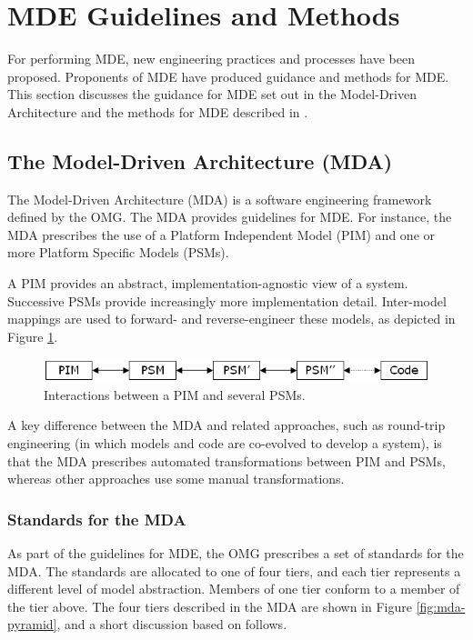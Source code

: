 
\section{MDE Guidelines and Methods}
\label{sec:mde_methods}
For performing MDE, new engineering practices and processes have been proposed. Proponents of MDE have produced guidance and methods for MDE. This section discusses the guidance for MDE set out in the Model-Driven Architecture \cite{mda} and the methods for MDE described in \cite{stahl06mdsd,kelly08dsm,greenfield04software}. 

\subsection{The Model-Driven Architecture (MDA)}
The Model-Driven Architecture (MDA) is a software engineering framework defined by the OMG. The MDA provides guidelines for MDE. For instance, the MDA prescribes the use of a Platform Independent Model (PIM) and one or more Platform Specific Models (PSMs).

A PIM provides an abstract, implementation-agnostic view of a system. Successive PSMs provide increasingly more implementation detail. Inter-model mappings are used to forward- and reverse-engineer these models, as depicted in
Figure \ref{fig:mda}.

\begin{figure}[htbp]
  \begin{center}
    \leavevmode
    \includegraphics[scale=0.5]{2.Background/images/PIMs_and_PSMs.png}
  \end{center}
  \caption{Interactions between a PIM and several PSMs.}
  \label{fig:mda}
\end{figure}

A key difference between the MDA and related approaches, such as round-trip engineering (in which models and code are co-evolved to develop a system), is that the MDA prescribes automated transformations between PIM and PSMs, whereas other approaches use some manual transformations.

\subsubsection{Standards for the MDA}
As part of the guidelines for MDE, the OMG prescribes a set of standards for the MDA. The standards are allocated to one of four tiers, and each tier represents a different level of model abstraction. Members of one tier conform to a member of the tier above. The four tiers described in the MDA are shown in Figure \ref{fig:mda-pyramid}, and a short discussion based on \cite[Section 8.2]{kleppe03mda} follows.

